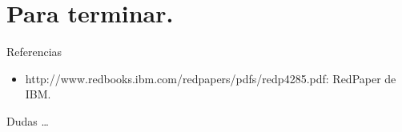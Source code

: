 \section{Para terminar.}

\begin{frame}[containsverbatim]{Referencias}
  \begin{itemize}
    \item http://www.redbooks.ibm.com/redpapers/pdfs/redp4285.pdf: RedPaper de IBM.
  \end{itemize}
\end{frame}

\begin{frame}{Dudas}
  \dots
\end{frame}


